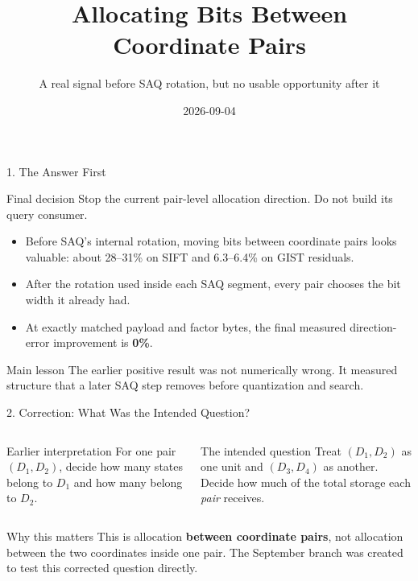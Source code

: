 \documentclass[aspectratio=169]{beamer}
\title{Allocating Bits Between Coordinate Pairs}
\subtitle{A real signal before SAQ rotation, but no usable opportunity after it}
\author{}
\date{2026-09-04}
\newcommand{\bad}[1]{\textcolor{red!75!black}{\textbf{#1}}}
\begin{document}
\begin{frame}\titlepage\end{frame}

\begin{frame}{1. The Answer First}
\begin{alertblock}{Final decision}
Stop the current pair-level allocation direction. Do not build its query
consumer.
\end{alertblock}
\begin{itemize}
  \item Before SAQ's internal rotation, moving bits between coordinate pairs
  looks valuable: about 28--31\% on SIFT and 6.3--6.4\% on GIST residuals.
  \item After the rotation used inside each SAQ segment, every pair chooses
  the bit width it already had.
  \item At exactly matched payload and factor bytes, the final measured
  direction-error improvement is \bad{0\%}.
\end{itemize}
\begin{block}{Main lesson}
The earlier positive result was not numerically wrong. It measured structure
that a later SAQ step removes before quantization and search.
\end{block}
\end{frame}

\begin{frame}{2. Correction: What Was the Intended Question?}
\begin{columns}[T]
\begin{block}{Earlier interpretation}
For one pair $(D_1,D_2)$, decide how many states belong to $D_1$ and how many
belong to $D_2$.
\end{block}
\begin{block}{The intended question}
Treat $(D_1,D_2)$ as one unit and $(D_3,D_4)$ as another. Decide how much of
the total storage each \emph{pair} receives.
\end{block}
\end{columns}
\begin{alertblock}{Why this matters}
This is allocation \textbf{between coordinate pairs}, not allocation between
the two coordinates inside one pair. The September branch was created to test
this corrected question directly.
\end{alertblock}
\end{frame}
\end{document}
